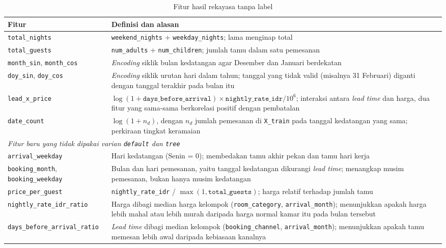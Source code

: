 \begin{table}[H]
	\centering
	\caption{Fitur hasil rekayasa tanpa label}
	\label{tab:fitur-baru}
	\small
	\begin{tabular}{l p{8.3cm}}
		\toprule
		\textbf{Fitur} & \textbf{Definisi dan alasan} \\
		\midrule
		\texttt{total\_nights} & \texttt{weekend\_nights} + \texttt{weekday\_nights}; lama menginap total \\
		\texttt{total\_guests} & \texttt{num\_adults} + \texttt{num\_children}; jumlah tamu dalam satu pemesanan \\
		\texttt{month\_sin}, \texttt{month\_cos} & \textit{Encoding} siklik bulan kedatangan agar Desember dan Januari berdekatan \\
		\texttt{doy\_sin}, \texttt{doy\_cos} & \textit{Encoding} siklik urutan hari dalam tahun; tanggal yang tidak valid (misalnya 31 Februari) diganti dengan tanggal terakhir pada bulan itu \\
		\texttt{lead\_x\_price} & $\log(1+\texttt{days\_before\_arrival})\times\texttt{nightly\_rate\_idr}/10^6$; interaksi antara \textit{lead time} dan harga, dua fitur yang sama-sama berkorelasi positif dengan pembatalan \\
		\texttt{date\_count} & $\log(1+n_d)$, dengan $n_d$ jumlah pemesanan di \texttt{X\_train} pada tanggal kedatangan yang sama; perkiraan tingkat keramaian \\
		\midrule
		\multicolumn{2}{l}{\textit{Fitur baru yang tidak dipakai varian \texttt{default} dan \texttt{tree}}} \\
		\midrule
		\texttt{arrival\_weekday} & Hari kedatangan (Senin = 0); membedakan tamu akhir pekan dan tamu hari kerja \\
		\texttt{booking\_month}, \texttt{booking\_weekday} & Bulan dan hari pemesanan, yaitu tanggal kedatangan dikurangi \textit{lead time}; menangkap musim pemesanan, bukan hanya musim kedatangan \\
		\texttt{price\_per\_guest} & \texttt{nightly\_rate\_idr} / $\max(1, \texttt{total\_guests})$; harga relatif terhadap jumlah tamu \\
		\texttt{nightly\_rate\_idr\_ratio} & Harga dibagi median harga kelompok (\texttt{room\_category}, \texttt{arrival\_month}); menunjukkan apakah harga lebih mahal atau lebih murah daripada harga normal kamar itu pada bulan tersebut \\
		\texttt{days\_before\_arrival\_ratio} & \textit{Lead time} dibagi median kelompok (\texttt{booking\_channel}, \texttt{arrival\_month}); menunjukkan apakah tamu memesan lebih awal daripada kebiasaan kanalnya \\
		\bottomrule
	\end{tabular}
\end{table}

